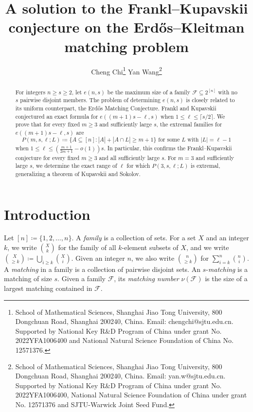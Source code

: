 \documentclass[10pt,a4paper]{article}
\numberwithin{equation}{section}
\theoremstyle{definition}
\newcommand{\F}{\mathcal F}
\begin{document}
\title{A solution to the Frankl--Kupavskii conjecture on the Erd\H{o}s--Kleitman matching problem}

\author{
    Cheng Chi\thanks{School of Mathematical Sciences, Shanghai Jiao Tong University, 800 Dongchuan Road, Shanghai 200240, China.
        Email: chengchi@sjtu.edu.cn.
        Supported by National Key R\&D Program of China under grant No. 2022YFA1006400 and National Natural Science Foundation of China No. 12571376.
    }
    \qquad
    Yan Wang\thanks{School of Mathematical Sciences, Shanghai Jiao Tong University, 800 Dongchuan Road, Shanghai 200240, China.
        Email: yan.w@sjtu.edu.cn.
        Supported by National Key R\&D Program of China under grant No. 2022YFA1006400, National Natural Science Foundation of China under grant No. 12571376 and SJTU-Warwick Joint Seed Fund.
    }
}

\date{}
\maketitle
\begin{abstract}
    For integers $n\ge s\ge2$, let $e(n,s)$ be the maximum size of a family
    $\F\subseteq2^{[n]}$ with no $s$ pairwise disjoint members.
    The problem of determining $e(n,s)$ is closely related to its uniform
    counterpart, the Erd\H{o}s Matching Conjecture.
    Frankl and Kupavskii conjectured an exact formula for $e((m+1)s-\ell,s)$ when $1\le \ell\le \lceil s/2\rceil$.
    We prove that for every fixed $m\ge3$ and sufficiently large $s$, the extremal families for $e((m+1)s-\ell,s)$ are
    \[
        P(m,s,\ell;L)\coloneqq\{A\subseteq [n]\colon |A|+|A\cap L|\ge m+1\} \text{ for some $L$ with } |L|=\ell-1
    \]
    when $1\le \ell\le (\frac{m+1}{2m+1}-o(1))s$.
    In particular, this confirms the Frankl--Kupavskii conjecture for every
    fixed $m\ge3$ and all sufficiently large $s$.
    For $m=3$ and sufficiently large $s$, we determine the exact range of $\ell$ for which $P(3,s,\ell;L)$ is extremal, generalizing a theorem of Kupavskii and Sokolov.
\end{abstract}

\section{Introduction}\label{sec:intro}

Let $[n]\coloneqq \{1,2,\ldots,n\}$.
A \emph{family} is a collection of sets.
For a set $X$ and an integer $k$, we write $\binom Xk$ for the family of
all $k$-element subsets of $X$, and we write
$\binom X{\ge k}\coloneqq \bigcup_{i\ge k}\binom Xi$.
Given an integer $n$, we also write $\binom{n}{\ge k}$ for $\sum_{i=k}^{n}\binom ni$.
A \emph{matching} in a family is a collection of pairwise disjoint sets.
An $s$-\emph{matching} is a matching of size $s$.
Given a family $\F$, its \emph{matching number} $\nu(\F)$ is the size of a
largest matching contained in $\F$.
\end{document}
